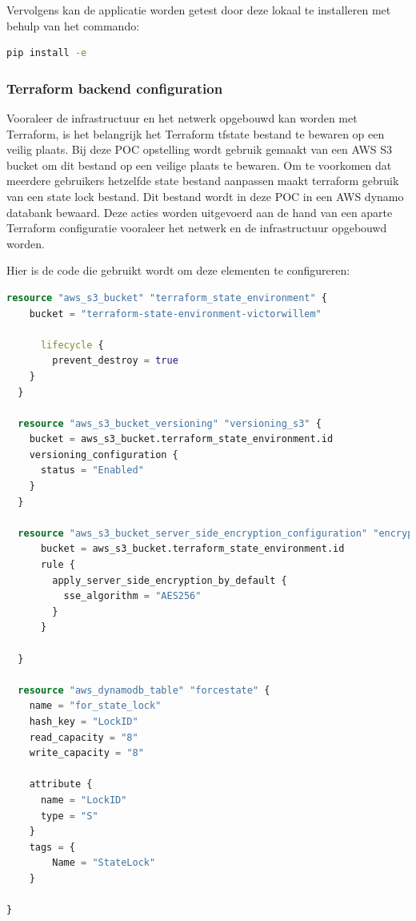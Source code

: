 \vspace{0.5cm}
Vervolgens kan de applicatie worden getest door deze lokaal te installeren met behulp van het commando:
\newline

\begin{lstlisting}[language=bash, style=bashstyle]
pip install -e
\end{lstlisting}

\subsubsection{
{Terraform backend configuration}}
\label{sec:Terraform backend configuratie}

Vooraleer de infrastructuur en het netwerk opgebouwd kan worden met Terraform, is het belangrijk het Terraform tfstate bestand te bewaren op een veilig plaats. Bij deze POC opstelling wordt gebruik gemaakt van een AWS S3 bucket om dit bestand op een veilige plaats te bewaren. Om te voorkomen dat meerdere gebruikers hetzelfde state bestand aanpassen maakt terraform gebruik van een state lock bestand. Dit bestand wordt in deze POC in een AWS dynamo databank bewaard. Deze acties worden uitgevoerd aan de hand van een aparte Terraform configuratie vooraleer het netwerk en de infrastructuur opgebouwd worden. 
\newline

Hier is de code die gebruikt wordt om deze elementen te configureren:
\newline

\begin{lstlisting}[language=terraform]
  resource "aws_s3_bucket" "terraform_state_environment" { 
    bucket = "terraform-state-environment-victorwillem" 
      
      lifecycle { 
        prevent_destroy = true 
    } 
  }

  resource "aws_s3_bucket_versioning" "versioning_s3" {
    bucket = aws_s3_bucket.terraform_state_environment.id
    versioning_configuration {
      status = "Enabled"
    }
  }
  
  resource "aws_s3_bucket_server_side_encryption_configuration" "encryption_s3" {
      bucket = aws_s3_bucket.terraform_state_environment.id
      rule {
        apply_server_side_encryption_by_default {
          sse_algorithm = "AES256"
        }
      }
    
  }

  resource "aws_dynamodb_table" "forcestate" {
    name = "for_state_lock"
    hash_key = "LockID"
    read_capacity = "8"
    write_capacity = "8"

    attribute {
      name = "LockID"
      type = "S"
    }
    tags = {
        Name = "StateLock"
    }
  
}
\end{lstlisting}

